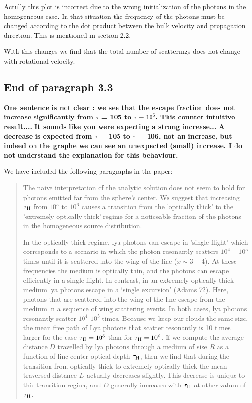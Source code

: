 \documentclass[12pt]{article}
\begin{document}
Actully this plot is incorrect due to the wrong initialization of the
photons in the homogeneous case. In that situation the frequency of
the photons must be changed according to the dot product between the
bulk velocity and propagation direction. This is mentioned in section
2.2.

With this changes we find that the total number of scatterings does
not change with rotational velocity.

\subsection*{End of paragraph 3.3}

{\bf One sentence is not clear : we see that the escape fraction does
  not increase significantly from $\tau$ = 105 to $\tau =
  10^{6}$. This counter-intuitive result.... It sounds like you were
  expecting a strong increase... A decrease is expected from $\tau$ =
  105 to $\tau$ = 106, not an increase, but indeed on the graphe we
  can see an unexpected (small) increase. I do not understand the
  explanation for this behaviour.} 


We have included the following paragraphs in the paper:

\begin{quote}
The naive interpretation of the analytic solution does not seem to
hold for photons emitted far from the sphere's center. 
We suggest that increasing $\tau_{\rm H}$ from $10^{5}$ to $10^{6}$ causes a
transition from the 'optically thick' to  the 'extremely optically
thick' regime for a noticeable fraction of the photons in the
homogeneous source distribution.

In the optically thick regime, lya  photons can escape in
'single flight' which corresponds to a scenario in which the
photon resonantly scatters $10^4-10^5$ times until it is scattered
into the wing of the line ($x\sim 3-4$). 
At these frequencies the medium is optically thin, and the photons can
escape efficiently in a single flight. 
In contrast, in an extremely optically thick medium lya
  photons escape in a `single excursion' (Adams 72). 
Here, photons that are scattered into the wing of the line escape from
the medium in a sequence of wing scattering events. 
In both cases, lya photons resonantly scatter $10^4$-$10^5$ times. 
Because we keep our clouds the same size, the mean free path of Lya
photons that scatter resonantly is 10 times larger for the case
$\tau_{\rm H}=10^5$ than for $\tau_{\rm H}=10^6$. 
If we compute the average distance $D$ travelled by lya
photons through a medium of size $R$ as a function of line center
optical depth $\tau_{\rm H}$, then we find that during the transition
from optically thick to extremely optically thick the mean traversed
distance $D$ actually decreases slightly.  
This decrease is unique to this transition region, and $D$ generally
increases with $\tau_{\rm H}$ at other values of $\tau_{\rm H}$.   
\end{quote}
\end{document}
